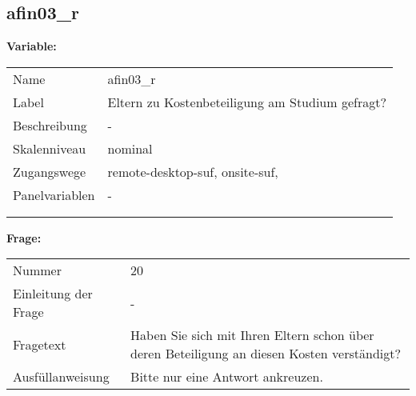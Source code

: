 	
	
	\subsection{afin03\_r}
	\label{subSection:afin03_r}

	\noindent\textbf{Variable:}\\
		\begin{tabular}{lL{11.3cm}}
			\label{tableVariable:afin03_r}
			Name & afin03\_r \\
			Label & Eltern zu Kostenbeteiligung am Studium gefragt? \\
			Beschreibung & - \\
			Skalenniveau & nominal \\
			Zugangswege &
				remote-desktop-suf,
				onsite-suf,
 \\
			Panelvariablen & -
			 \\
			 \\
 \\
		\end{tabular}

		\vspace*{1 cm}
		\noindent\textbf{Frage:}\\
		\begin{tabular}{lL{11.3cm}}
			\label{tableQuestion:afin03_r}
			Nummer & 20 \\
			Einleitung der Frage & - \\
			Fragetext & Haben Sie sich mit Ihren Eltern schon über deren Beteiligung an diesen Kosten verständigt? \\
			Ausfüllanweisung & Bitte nur eine Antwort ankreuzen. \\
		\end{tabular}






